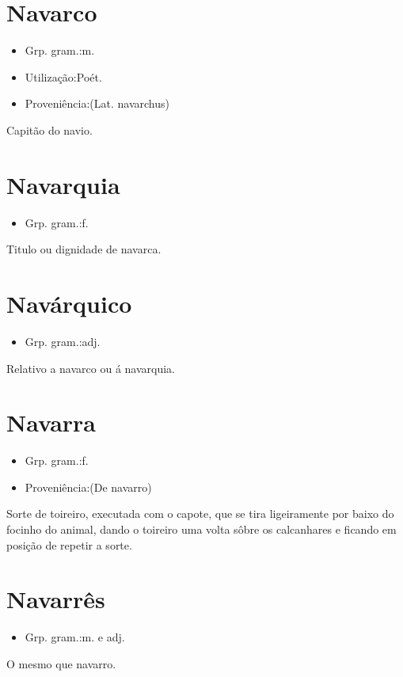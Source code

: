 \section{Navarco}
\begin{itemize}
\item {Grp. gram.:m.}
\end{itemize}
\begin{itemize}
\item {Utilização:Poét.}
\end{itemize}
\begin{itemize}
\item {Proveniência:(Lat. \textunderscore navarchus\textunderscore )}
\end{itemize}
Capitão do navio.
\section{Navarquia}
\begin{itemize}
\item {Grp. gram.:f.}
\end{itemize}
Titulo ou dignidade de navarca.
\section{Navárquico}
\begin{itemize}
\item {Grp. gram.:adj.}
\end{itemize}
Relativo a navarco ou á navarquia.
\section{Navarra}
\begin{itemize}
\item {Grp. gram.:f.}
\end{itemize}
\begin{itemize}
\item {Proveniência:(De \textunderscore navarro\textunderscore )}
\end{itemize}
Sorte de toireiro, executada com o capote, que se tira ligeiramente por baixo do focinho do animal, dando o toireiro uma volta sôbre os calcanhares e ficando em posição de repetir a sorte.
\section{Navarrês}
\begin{itemize}
\item {Grp. gram.:m.  e  adj.}
\end{itemize}
O mesmo que \textunderscore navarro\textunderscore .
